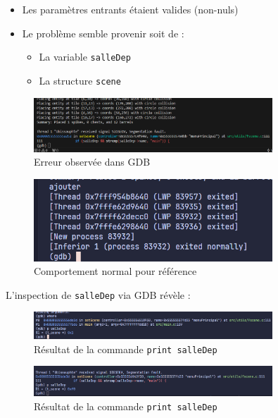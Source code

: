 \documentclass[a4paper,11pt]{article}
\begin{document}
\begin{itemize}
    \item Les paramètres entrants étaient valides (non-nuls)
    \item Le problème semble provenir soit de :
    \begin{itemize}
        \item La variable \texttt{salleDep}
        \item La structure \texttt{scene}
    \end{itemize}
\end{itemize}

\begin{figure}[ht]
    \centering
    \includegraphics[width=0.8\textwidth]{./img/gdbSystem.png}
    \caption{Erreur observée dans GDB}
    \label{fig:gdb_error}
\end{figure}

\begin{figure}[ht]
    \centering
    \includegraphics[width=0.8\textwidth]{./img/ExempleMarcheBien.png}
    \caption{Comportement normal pour référence}
    \label{fig:working_example}
\end{figure}

L'inspection de \texttt{salleDep} via GDB révèle :

\begin{figure}[ht]
    \centering
    \includegraphics[width=0.8\textwidth]{./img/ErreurAvecPrint.png}
    \caption{Résultat de la commande \texttt{print salleDep}}
    \label{fig:gdb_print}
\end{figure}

\begin{figure}[ht]
  \centering
  \includegraphics[width=0.8\textwidth]{./img/Erreur2.png}
  \caption{Résultat de la commande \texttt{print salleDep}}
  \label{fig:gdb_print2}
\end{figure}
\end{document}
